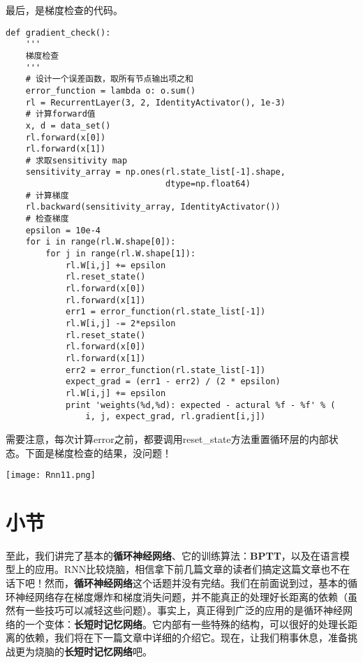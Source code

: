 最后，是梯度检查的代码。
\begin{lstlisting}
def gradient_check():
    '''
    梯度检查
    '''
    # 设计一个误差函数，取所有节点输出项之和
    error_function = lambda o: o.sum()
    rl = RecurrentLayer(3, 2, IdentityActivator(), 1e-3)
    # 计算forward值
    x, d = data_set()
    rl.forward(x[0])
    rl.forward(x[1])
    # 求取sensitivity map
    sensitivity_array = np.ones(rl.state_list[-1].shape,
                                dtype=np.float64)
    # 计算梯度
    rl.backward(sensitivity_array, IdentityActivator())
    # 检查梯度
    epsilon = 10e-4
    for i in range(rl.W.shape[0]):
        for j in range(rl.W.shape[1]):
            rl.W[i,j] += epsilon
            rl.reset_state()
            rl.forward(x[0])
            rl.forward(x[1])
            err1 = error_function(rl.state_list[-1])
            rl.W[i,j] -= 2*epsilon
            rl.reset_state()
            rl.forward(x[0])
            rl.forward(x[1])
            err2 = error_function(rl.state_list[-1])
            expect_grad = (err1 - err2) / (2 * epsilon)
            rl.W[i,j] += epsilon
            print 'weights(%d,%d): expected - actural %f - %f' % (
                i, j, expect_grad, rl.gradient[i,j])
\end{lstlisting}

需要注意，每次计算error之前，都要调用reset\_state方法重置循环层的内部状态。下面是梯度检查的结果，没问题！

\texttt{[image: Rnn11.png]}


\section{小节}

至此，我们讲完了基本的\textbf{循环神经网络}、它的训练算法：\textbf{BPTT}，以及在语言模型上的应用。RNN比较烧脑，相信拿下前几篇文章的读者们搞定这篇文章也不在话下吧！然而，\textbf{循环神经网络}这个话题并没有完结。我们在前面说到过，基本的循环神经网络存在梯度爆炸和梯度消失问题，并不能真正的处理好长距离的依赖（虽然有一些技巧可以减轻这些问题）。事实上，真正得到广泛的应用的是循环神经网络的一个变体：\textbf{长短时记忆网络}。它内部有一些特殊的结构，可以很好的处理长距离的依赖，我们将在下一篇文章中详细的介绍它。现在，让我们稍事休息，准备挑战更为烧脑的\textbf{长短时记忆网络}吧。


